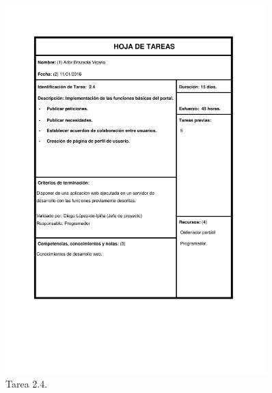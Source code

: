 \documentclass{DeustoFDP}
\begin{document}
\begin{figure}[H]
	\centering
	\includegraphics[width=0.9\textwidth]{fig/Tareas/24}
	\caption{Tarea 2.4.}
	\label{fig:t24}
\end{figure}
\end{document}
